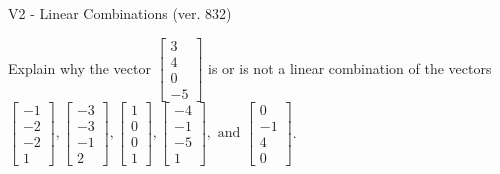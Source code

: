 \begin{exercise}
  \begin{exerciseTitle}V2 - Linear Combinations (ver. 832)\end{exerciseTitle}
  \begin{exerciseStatement}
    Explain why the vector \(\left[\begin{array}{c}
3 \\
4 \\
0 \\
-5
\end{array}\right]\)  is or is not a linear 
	combination of the vectors \(\left[\begin{array}{c}
-1 \\
-2 \\
-2 \\
1
\end{array}\right] , \left[\begin{array}{c}
-3 \\
-3 \\
-1 \\
2
\end{array}\right] , \left[\begin{array}{c}
1 \\
0 \\
0 \\
1
\end{array}\right] , \left[\begin{array}{c}
-4 \\
-1 \\
-5 \\
1
\end{array}\right] , \text{ and } \left[\begin{array}{c}
0 \\
-1 \\
4 \\
0
\end{array}\right]\).
	



\end{exerciseStatement}
\end{exercise}
